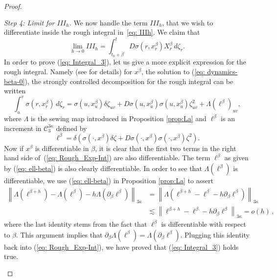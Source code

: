 \documentclass[10pt,a4paper]{amsart}
\newcommand{\ka}{\kappa}
\newcommand{\lp}{\left(}
\newcommand{\rp}{\right)}
\begin{document}
\begin{proof}
\begin{enumerate}[wide, labelwidth=!, labelindent=0pt, label=\emph{(\roman*)}]
\smallskip
\noindent
\textit{Step 4: Limit for $III_{h}$.} 
We now handle the term $III_{h}$, that we wish to differentiate inside the rough integral in~\eqref{eq: IIIh}. We claim that 
\begin{equation}\label{eq: Integral_3}
    \lim_{h\to 0}III_{h}=\int_{t_{0}+\beta}^{t} D\sigma(r,x_{r}^{\beta})X_{r}^{\beta}\,d\zeta_{r} .
\end{equation}
In order to prove (\ref{eq: Integral_3}), let us give a more explicit expression for the rough integral. Namely (see \cite{gubinelli} for details) for $x^{\beta}$, the solution to (\ref{eq: dynamics-beta-0}), the strongly controlled decomposition for the rough integral can be written
\begin{equation}\label{eq: Rough_Exp-Int}
    \int_{u}^{v}\sigma(r,x_{r}^{\beta})\, d\zeta_{r}=\sigma(u,x_{u}^{\beta})\delta \zeta_{uv}+ D\sigma(u,x_{u}^{\beta})\sigma(u,x_{u}^{\beta})\zeta_{uv}^{2}+ \Lambda(\ell^{\beta})_{uv},
\end{equation}
where $\Lambda$ is the sewing map introduced in Proposition \ref{prop:La} and $\ell^{\beta}$ is an increment in $\mathcal{C}_{3}^{3\ka}$ defined by
\begin{equation}\label{eq: ell-beta}
    \ell^{\beta}=\delta\lp \sigma(\cdot,x^{\beta})\delta \zeta +D\sigma(\cdot,x^{\beta})\sigma(\cdot,x^{\beta})\zeta^{2}\rp.
\end{equation}
Now if $x^{\beta}$ is differentiable in $\beta$, it is clear that the first two terms in the right hand side of~(\ref{eq: Rough_Exp-Int}) are also differentiable. The term $\ell^{\beta}$ as given by (\ref{eq: ell-beta}) is also clearly differentiable. In order to see that $\Lambda(\ell^{\beta})$ is differentiable, we use 
(\ref{eq: ell-beta}) in Proposition \ref{prop:La} to assert
\begin{align*}
   \left\| \Lambda(\ell^{\beta+h})- \Lambda(\ell^{\beta})-h\Lambda(\partial_{\beta}\ell^{\beta})\right\|_{3\kappa}
   &=
   \left\| \Lambda(\ell^{\beta + h} -\ell^{\beta}-h\partial_{\beta}\ell^{\beta}) \right\|_{3\kappa} \\ 
   &\lesssim 
   \left\|\ell^{\beta+h}-\ell^{\beta}-h\partial_{\beta}\ell^{\beta}\right\|_{3\kappa}=o(h) \, ,
\end{align*}
where the last identity stems from the fact that $\ell^{\beta}$ is differentiable with respect to $\beta$. This argument implies that $\partial_{\beta}\Lambda(\ell^{\beta})=\Lambda(\partial_{\beta}\ell^{\beta})$. Plugging this identity back into (\ref{eq: Rough_Exp-Int}), we have proved that (\ref{eq: Integral_3}) holds true.


\end{enumerate}
\end{proof}
\end{document}
